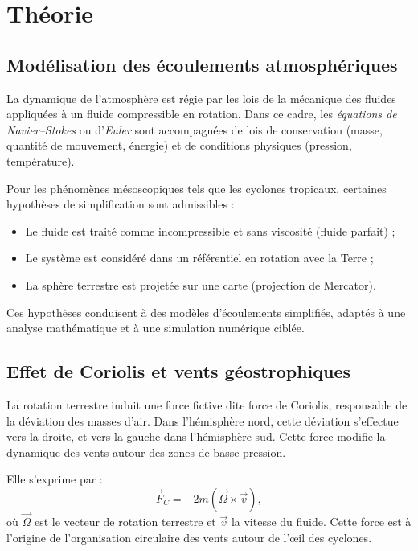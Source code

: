 \chapter{Th\'eorie}

\section{Mod\'elisation des \'ecoulements atmosph\'eriques}

La dynamique de l'atmosph\`ere est r\'egie par les lois de la m\'ecanique des fluides appliqu\'ees \`a un fluide compressible en rotation. Dans ce cadre, les \textit{\'equations de Navier--Stokes} ou d'\textit{Euler} sont accompagn\'ees de lois de conservation (masse, quantit\'e de mouvement, \'energie) et de conditions physiques (pression, temp\'erature).

Pour les ph\'enom\`enes m\'esoscopiques tels que les cyclones tropicaux, certaines hypoth\`eses de simplification sont admissibles :
\begin{itemize}
    \item Le fluide est trait\'e comme incompressible et sans viscosit\'e (fluide parfait) ;
    \item Le syst\`eme est consid\'er\'e dans un r\'ef\'erentiel en rotation avec la Terre ;
    \item La sph\`ere terrestre est projet\'ee sur une carte (projection de Mercator).
\end{itemize}

Ces hypoth\`eses conduisent \`a des mod\`eles d'\'ecoulements simplifi\'es, adapt\'es \`a une analyse math\'ematique et \`a une simulation num\'erique cibl\'ee.

\section{Effet de Coriolis et vents g\'eostrophiques}

La rotation terrestre induit une force fictive dite force de Coriolis, responsable de la d\'eviation des masses d'air. Dans l'h\'emisph\`ere nord, cette d\'eviation s'effectue vers la droite, et vers la gauche dans l'h\'emisph\`ere sud. Cette force modifie la dynamique des vents autour des zones de basse pression.

Elle s'exprime par :
\[
\vec{F}_C = -2m (\vec{\Omega} \times \vec{v}),
\]
o\`u $\vec{\Omega}$ est le vecteur de rotation terrestre et $\vec{v}$ la vitesse du fluide. Cette force est \`a l'origine de l'organisation circulaire des vents autour de l'\oe il des cyclones.

